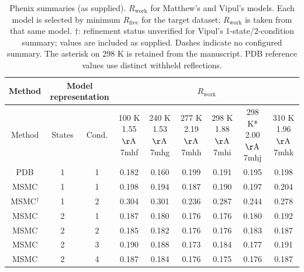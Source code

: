 \begin{table}[htbp]
\centering
\small
\begin{tabular}{|c|c|c|c|c|c|c|c|c|}
\hline
Method & \multicolumn{2}{c|}{Model representation} & \multicolumn{6}{c|}{$R_{\mathrm{work}}$} \\
\hline
Method & States & Cond. & \shortstack{100 K \\ 1.55 $\mathrm{\AA}$ \\ 7mhf} & \shortstack{240 K \\ 1.53 $\mathrm{\AA}$ \\ 7mhg} & \shortstack{277 K \\ 2.19 $\mathrm{\AA}$ \\ 7mhh} & \shortstack{298 K \\ 1.88 $\mathrm{\AA}$ \\ 7mhi} & \shortstack{298 K* \\ 2.00 $\mathrm{\AA}$ \\ 7mhj} & \shortstack{310 K \\ 1.96 $\mathrm{\AA}$ \\ 7mhk} \\
\hline
PDB & 1 & 1 & 0.182 & 0.160 & 0.199 & 0.191 & 0.195 & 0.198 \\ \hline
MSMC & 1 & 1 & 0.198 & 0.194 & 0.187 & 0.190 & 0.197 & 0.204 \\ \hline
MSMC$^{\dagger}$ & 1 & 2 & 0.304 & 0.301 & 0.236 & 0.287 & 0.244 & 0.278 \\ \hline
MSMC & 2 & 1 & 0.187 & 0.180 & 0.176 & 0.176 & 0.180 & 0.192 \\ \hline
MSMC & 2 & 2 & 0.185 & 0.182 & 0.176 & 0.176 & 0.183 & 0.187 \\ \hline
MSMC & 2 & 3 & 0.190 & 0.188 & 0.173 & 0.184 & 0.177 & 0.191 \\ \hline
MSMC & 2 & 4 & 0.187 & 0.184 & 0.176 & 0.175 & 0.176 & 0.187 \\ \hline
\end{tabular}
\caption{Phenix summaries (as supplied). $R_{\mathrm{work}}$ for Matthew's and Vipul's models. Each model is selected by minimum $R_{\mathrm{free}}$ for the target dataset; $R_{\mathrm{work}}$ is taken from that same model. $\dagger$: refinement status unverified for Vipul's 1-state/2-condition summary; values are included as supplied. Dashes indicate no configured summary. The asterisk on 298 K is retained from the manuscript. PDB reference values use distinct withheld reflections.}
\label{tab:combined_phenix_summary_r_work}
\end{table}
